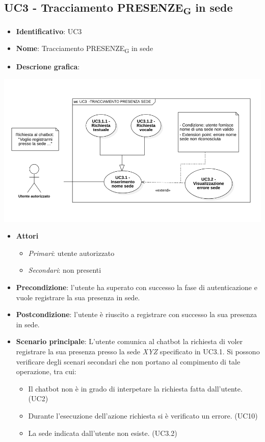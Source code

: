 \subsection{UC3 - Tracciamento PRESENZE\textsubscript{G} in sede}
\begin{itemize}
    \item \textbf{Identificativo}: UC3
    \item \textbf{Nome}: Tracciamento PRESENZE\textsubscript{G} in sede
    \item \textbf{Descrione grafica}:
\end{itemize}
\begin{center}
    \includegraphics[scale=0.50]{images/UC3.png} 
\end{center}
\begin{itemize}
    \item \textbf{Attori}
 \begin{itemize} 
    \item \textit{Primari}: utente autorizzato
    \item \textit{Secondari}: non presenti
 \end{itemize}
 \item \textbf{Precondizione}: l'utente ha superato con successo la fase di autenticazione e vuole registrare la sua presenza in sede. 
 \item \textbf{Postcondizione}: l'utente è riuscito a registrare con successo la sua presenza in sede. 
 \item \textbf{Scenario principale}: L'utente comunica al chatbot la richiesta di voler registrare la sua presenza presso la sede \textit{XYZ} specificato in UC3.1. Si possono verificare degli scenari secondari che non portano al compimento di tale operazione, tra cui:
    \begin{itemize}
        \item Il chatbot non è in grado di interpetare la richiesta fatta dall'utente. (UC2)
        \item Durante l'esecuzione dell'azione richiesta si è verificato un errore. (UC10)
        \item La sede indicata dall'utente non esiste. (UC3.2)
    \end{itemize}
\end{itemize}
\newpage

